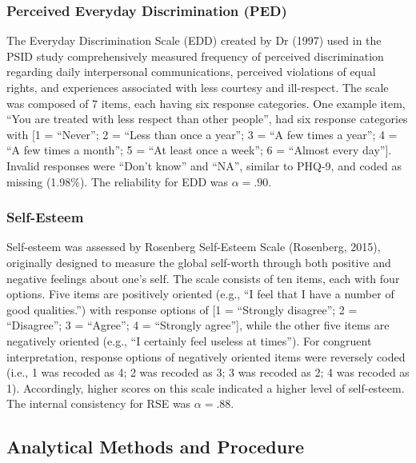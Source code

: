 \documentclass[
  man]{apa7}
\begin{document}
\hypertarget{perceived-everyday-discrimination-ped}{%
\subsubsection{Perceived Everyday Discrimination (PED)}\label{perceived-everyday-discrimination-ped}}

The Everyday Discrimination Scale (EDD) created by Dr (1997) used in the PSID study comprehensively measured frequency of perceived discrimination regarding daily interpersonal communications, perceived violations of equal rights, and experiences associated with less courtesy and ill-respect. The scale was composed of 7 items, each having six response categories. One example item, ``You are treated with less respect than other people'', had six response categories with {[}1 = ``Never''; 2 = ``Less than once a year''; 3 = ``A few times a year''; 4 = ``A few times a month''; 5 = ``At least once a week''; 6 = ``Almost every day''{]}. Invalid responses were ``Don't know'' and ``NA'', similar to PHQ-9, and coded as missing (1.98\%). The reliability for EDD was \(\alpha = .90\).

\hypertarget{self-esteem}{%
\subsubsection{Self-Esteem}\label{self-esteem}}

Self-esteem was assessed by Rosenberg Self-Esteem Scale (Rosenberg, 2015), originally designed to measure the global self-worth through both positive and negative feelings about one's self. The scale consists of ten items, each with four options. Five items are positively oriented (e.g., ``I feel that I have a number of good qualities.'') with response options of {[}1 = ``Strongly disagree''; 2 = ``Disagree''; 3 = ``Agree''; 4 = ``Strongly agree''{]}, while the other five items are negatively oriented (e.g., ``I certainly feel useless at times''). For congruent interpretation, response options of negatively oriented items were reversely coded (i.e., 1 was recoded as 4; 2 was recoded as 3; 3 was recoded as 2; 4 was recoded as 1). Accordingly, higher scores on this scale indicated a higher level of self-esteem. The internal consistency for RSE was \(\alpha = .88\).

\hypertarget{analytical-methods-and-procedure}{%
\subsection{Analytical Methods and Procedure}\label{analytical-methods-and-procedure}}
\end{document}
